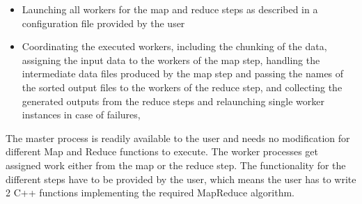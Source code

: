 \documentclass[conference,final]{IEEEtran}
\begin{document}
\begin{itemize}
\item Launching all workers for the map and reduce steps as described
  in a configuration file provided by the user 
\item Coordinating the executed workers, including the chunking of the
  data, assigning the input data to the workers of the map step,
  handling the intermediate data files produced by the map step and
  passing the names of the sorted output files to the workers of the
  reduce step, and collecting the generated outputs from the reduce
  steps and relaunching single worker instances in case of failures,
\end{itemize}

The master process is readily available to the user and needs no
modification for different Map and Reduce functions to execute.  The
worker processes get assigned work either from the map or the reduce
step. The functionality for the different steps have to be provided by
the user, which means the user has to write 2 C++ functions
implementing the required MapReduce algorithm.
\end{document}
